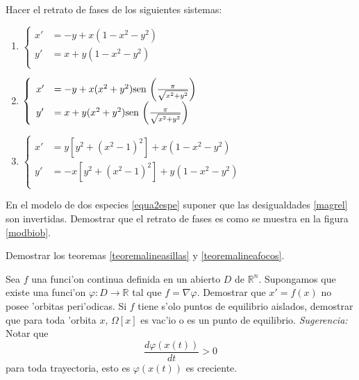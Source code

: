 \begin{ejercicio}{} Hacer el retrato de fases de los siguientes
sistemas:
\begin{enumerate}
\item   $\left\{%
\begin{array}{ll}
 x'&=-y+x(1-x^2-y^2)\\
    y'&=x+y(1-x^2-y^2)\\
\end{array}%
\right.$
\item $
\left\{
    \begin{array}{ll}
  x'&=-y+x(x^2+y^2)\hbox{sen }
  \bigg(\frac{\pi}{\sqrt{x^2+y^2}}\bigg)\\
    y'&=x+y(x^2+y^2)\hbox{sen
 }\bigg(\frac{\pi}{\sqrt{x^2+y^2}}\bigg)\\
 \end{array}
 \right.$

\item $
   \left\{%
 \begin{array}{ll}
  x'&=y[y^2+(x^2-1)^2]+x(1-x^2-y^2)\\
     y'&=-x[y^2+(x^2-1)^2]+y(1-x^2-y^2)\\
 \end{array}%
\right.
$
\end{enumerate}
\end{ejercicio}

\begin{ejercicio}{} En el modelo de dos especies \eqref{equa2espe}
suponer que las desigualdades \eqref{magrel} son invertidas.
Demostrar que el retrato de fases es como se muestra en la figura
\ref{modbiob}.

\end{ejercicio}



\begin{ejercicio}{} Demostrar los teoremas \ref{teoremalineasillas}
y \ref{teoremalineafocos}.
\end{ejercicio}



\begin{ejercicio}{} Sea $f$ una funci'on continua definida en un
abierto $D$ de $\mathbb{R}^n$. Supongamos que existe una funci'on
$\varphi:D\to\mathbb{R}$ tal que $f=\nabla\varphi$. Demostrar que
$x'=f(x)$ no posee 'orbitas peri'odicas. Si $f$ tiene s'olo puntos
de equilibrio aislados, demostrar que para toda 'orbita $x$,
$\Omega[x]$ es vac'io o es un punto de equilibrio.
\emph{Sugerencia:} Notar que
\[
    \frac{d\varphi(x(t))}{dt}>0
\]
para toda trayectoria, esto es $\varphi(x(t))$ es creciente.

\end{ejercicio}

